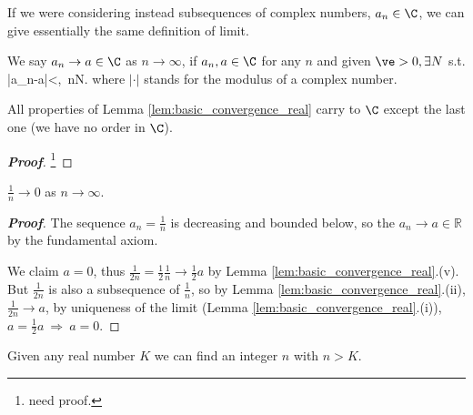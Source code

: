 If we were considering instead subsequences of complex numbers, $a_n\in\C$, we can give essentially the same definition of limit. 

\begin{definition}\label{def:convergence_limit_complex}
We say $a_n\to a\in\C$ as $n\to \infty$, if $a_n,a\in \C$ for any $n$ and given $\ve>0,\exists N$ s.t. 
\be
|a_n-a|<\ve,\ \forall n\geq N.
\ee
where $|\cdot|$ stands for the modulus of a complex number.


\end{definition}

\begin{lemma}\label{lem:basic_convergence_complex} 
All properties of Lemma \ref{lem:basic_convergence_real} carry to $\C$ except the last one (we have no order in $\C$).
\end{lemma}

\begin{proof}[\bf Proof]
\footnote{need proof.}
\end{proof}

\begin{theorem}\label{thm:axiom_of_archimedes}
$\frac 1n\to 0$ as $n\to \infty$.
\end{theorem}

\begin{proof}[{\bf Proof}]
The sequence $a_n=\frac 1n$ is decreasing and bounded below, so the $a_n\to a\in\mathbb{R}$ by the fundamental axiom.

We claim $a=0$, thus $\frac{1}{2n}=\frac 12 \frac1n\to \frac 12a$ by Lemma \ref{lem:basic_convergence_real}.(v). But $\frac{1}{2n}$ is also a subsequence of $\frac 1n$, so by Lemma \ref{lem:basic_convergence_real}.(ii), $\frac{1}{2n}\to a$, by uniqueness of the limit (Lemma \ref{lem:basic_convergence_real}.(i)), $a=\frac 12a\ \Rightarrow \ a=0$.
\end{proof}

\begin{corollary} 
Given any real number $K$ we can find an integer $n$ with $n>K$.
\end{corollary}

